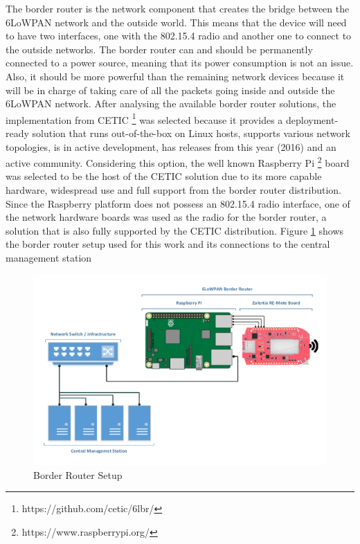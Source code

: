 The border router is the network component that creates the bridge between the \gls{6LoWPAN} network and the outside world. This means that the device will need to have two interfaces, one with the 802.15.4 radio and another one to connect to the outside networks. The border router can and should be permanently connected to a power source, meaning that its power consumption is not an issue. Also, it should be more powerful than the remaining network devices because it will be in charge of taking care of all the packets going inside and outside the \gls{6LoWPAN} network. After analysing the available border router solutions, the implementation from \gls{CETIC} \footnote{https://github.com/cetic/6lbr/} was selected because it provides a deployment-ready solution that runs out-of-the-box on Linux hosts, supports various network topologies, is in active development, has releases from this year (2016) and an active community. Considering this option, the well known Raspberry Pi \footnote{https://www.raspberrypi.org/} board was selected to be the host of the \gls{CETIC} solution due to its more capable hardware, widespread use and full support from the border router distribution. Since the Raspberry platform does not possess an 802.15.4 radio interface, one of the network hardware boards was used as the radio for the border router, a solution that is also fully supported by the \gls{CETIC} distribution. Figure \ref{fig:border_router_setup} shows the border router setup used for this work and its connections to the central management station

\begin{figure}[h]
  \centering
  \includegraphics[width=1.0\linewidth]{figures/Border_Router.pdf}
  \caption{Border Router Setup}
  \label{fig:border_router_setup}
\end{figure}

